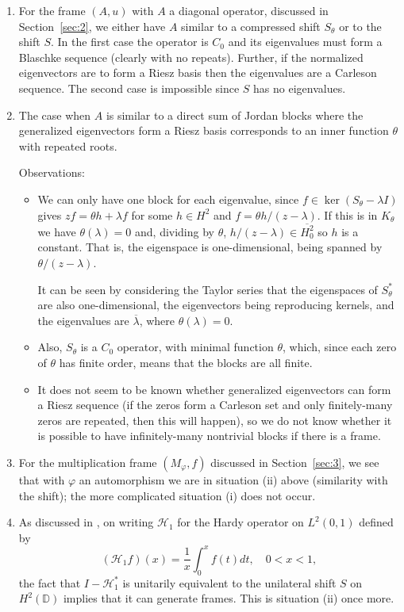 \documentclass[11pt]{amsart}
\theoremstyle{definition}
\theoremstyle{remark}
\numberwithin{equation}{section}
\newcommand{\ol}{\overline}
\def\DD{{\mathbb D}}
\def\phi{\varphi}
\begin{document}
\begin{enumerate}
\item For the frame $(A,u)$ with $A$ a diagonal operator,   discussed in Section~\ref{sec:2}, we either have $A$ similar to
a compressed shift $S_\theta$ or to
the shift $S$.
In the first case the operator is $C_0$ and its eigenvalues must form a Blaschke sequence
(clearly with no repeats). Further,
if the normalized eigenvectors are to form a Riesz basis then the eigenvalues are
a Carleson sequence.
The second case is impossible since $S$ has no eigenvalues.

\item The case when $A$ is similar to a direct sum of Jordan blocks
where the generalized eigenvectors form a Riesz basis
 corresponds to an inner function $\theta$ with repeated roots.

Observations:
\begin{itemize}
\item We can only have one block for each  eigenvalue, since $f \in \ker(S_\theta-\lambda I)$
gives $zf=\theta h + \lambda f$ for some $h \in H^2$ and $f=\theta h/(z-\lambda)$.
If this is in $K_\theta$ we have $\theta(\lambda)=0$ and, dividing by $\theta$, $h/(z-\lambda) \in \ol{H^2_0}$ so $h$ is a constant. That is, the eigenspace is one-dimensional, being spanned by $\theta/(z-\lambda)$.

It can be seen by considering the Taylor series
that the eigen\-spaces of $S_\theta^*$ are also one-dimensional, the eigenvectors being reproducing kernels, and the eigenvalues are $\ol\lambda$, where $\theta(\lambda)=0$.

\item Also, $S_\theta$ is a $C_0$ operator, with minimal function $\theta$, which, since
each zero of
$\theta$ has finite order, means that the blocks are all finite.

\item It does not seem to be known whether generalized eigenvectors can form a
Riesz sequence (if the zeros form a Carleson set and only finitely-many zeros are repeated,
then this will happen), so we do not know whether it is possible to have infinitely-many
nontrivial blocks if there is a frame.

\end{itemize}

\item
For the multiplication frame $(M_\phi, f)$ discussed in Section~\ref{sec:3},
we see that with $\phi$ an automorphism we are in situation (ii) above (similarity with the shift); the more complicated situation (i) does not occur.\\

\item As discussed in \cite{GPR-Hardy}, on writing $\mathcal{H}_1$ for the Hardy operator
on $L^2(0,1)$ defined by
$$(\mathcal{H}_1 f)(x) = \frac{1}{x} \int_{0}^{x} f(t) dt, \quad 0 < x < 1,$$
the fact that $I-\mathcal{H}_1^*$ is unitarily equivalent to the
unilateral shift $S$ on $H^2(\DD)$ implies that it can generate frames. This is situation (ii) once more.
\end{enumerate}
\end{document}
